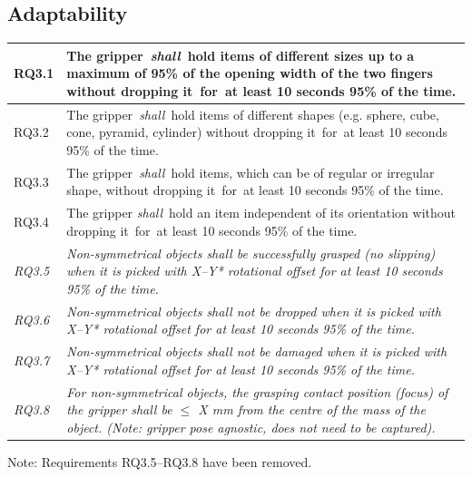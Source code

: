 \documentclass[lettersize,journal]{IEEEtran}
\begin{document}
\subsection{Adaptability} \label{adaptability}
\begin{center}
	\begin{tabular}{|p{7mm}|p{72mm}|}
		\hline
RQ3.1 & The gripper \emph{shall} hold items of different sizes up to a maximum of 95\% of the opening width of the two fingers without dropping it for at least 10 seconds 95\% of the time. \\
\hline
RQ3.2 & The gripper \emph{shall} hold items of different shapes (e.g. sphere, cube, cone, pyramid, cylinder) without dropping it for at least 10 seconds 95\% of the time. \\
\hline
RQ3.3 & The gripper \emph{shall} hold items, which can be of regular or irregular shape, without dropping it for at least 10 seconds 95\% of the time. \\ 
\hline
RQ3.4 & The gripper \emph{shall} hold an item independent of its orientation without dropping it for at least 10 seconds 95\% of the time. \\ 	 
\hline
\emph{RQ3.5} & \emph{Non-symmetrical objects \emph{shall} be successfully grasped (no slipping) when it is picked with X–Y* rotational offset for at least 10 seconds 95\% of the time.}  \\ 
\hline
\emph{RQ3.6} & \emph{Non-symmetrical objects \emph{shall} not be dropped when it is picked with X–Y* rotational offset for at least 10 seconds 95\% of the time.}\\
\hline
\emph{RQ3.7} & \emph{Non-symmetrical objects \emph{shall} not be damaged when it is picked with X–Y* rotational offset for at least 10 seconds 95\% of the time.}\\
\hline
\emph{RQ3.8} & \emph{For non-symmetrical objects, the grasping contact position (focus) of the gripper \emph{shall} be $\le$ X mm from the centre of the mass of the object. (Note: gripper pose agnostic, does not need to be captured).}\\	[1ex] 
\hline
	\end{tabular}
\end{center}
\noindent Note: Requirements RQ3.5--RQ3.8 have been removed.
\end{document}
